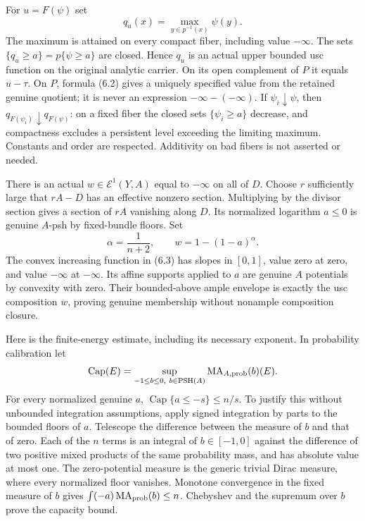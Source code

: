 \documentclass[
  10pt,
]{article}
\begin{document}
For \(u=F(\psi)\) set
\[q_u(x)=\max_{y\in p^{-1}(x)}\psi(y).                    \tag{6.2}\]
The maximum is attained on every compact fiber, including value
\(-\infty\). The sets \(\{q_u\geq a\}=p\{\psi\geq a\}\) are closed.
Hence \(q_u\) is an actual upper bounded usc function on the original
analytic carrier. On its open complement of \(P\) it equals \(u-\tau\).
On \(P\), formula (6.2) gives a uniquely specified value from the
retained genuine quotient; it is never an expression
\(-\infty-(-\infty)\). If \(\psi_i\downarrow\psi\), then
\(q_{F(\psi_i)}\downarrow q_{F(\psi)}\): on a fixed fiber the closed
sets \(\{\psi_i\geq a\}\) decrease, and compactness excludes a
persistent level exceeding the limiting maximum. Constants and order are
respected. Additivity on bad fibers is not asserted or needed.

There is an actual \(w\in\mathcal E^1(Y,A)\) equal to \(-\infty\) on all
of \(D\). Choose \(r\) sufficiently large that \(rA-D\) has an effective
nonzero section. Multiplying by the divisor section gives a section of
\(rA\) vanishing along \(D\). Its normalized logarithm \(a\leq0\) is
genuine \(A\)-psh by fixed-bundle floors. Set
\[\alpha=\frac1{n+2},\qquad w=1-(1-a)^\alpha.             \tag{6.3}\]
The convex increasing function in (6.3) has slopes in \([0,1]\), value
zero at zero, and value \(-\infty\) at \(-\infty\). Its affine supports
applied to \(a\) are genuine \(A\) potentials by convexity with zero.
Their bounded-above ample envelope is exactly the usc composition \(w\),
proving genuine membership without nonample composition closure.

Here is the finite-energy estimate, including its necessary exponent. In
probability calibration let
\[\operatorname{Cap}(E)=\sup_{-1\leq b\leq0,\ b\in\operatorname{PSH}(A)}\operatorname{MA}_{A,\rm prob}(b)(E).\]
For every normalized genuine \(a\),
\(\operatorname{Cap}\{a\leq-s\}\leq n/s\). To justify this without
unbounded integration assumptions, apply signed integration by parts to
the bounded floors of \(a\). Telescope the difference between the
measure of \(b\) and that of zero. Each of the \(n\) terms is an
integral of \(b\in[-1,0]\) against the difference of two positive mixed
products of the same probability mass, and has absolute value at most
one. The zero-potential measure is the generic trivial Dirac measure,
where every normalized floor vanishes. Monotone convergence in the fixed
measure of \(b\) gives
\(\int(-a)\operatorname{MA}_{\rm prob}(b)\leq n\). Chebyshev and the
supremum over \(b\) prove the capacity bound.
\end{document}
